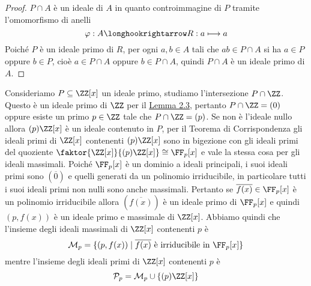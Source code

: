 \documentclass[11pt]{scrartcl}
\begin{document}
	\begin{proof}
		$P\cap A$ è un ideale di $A$ in quanto controimmagine di $P$ tramite
		l'omomorfismo di anelli
		\[
		\varphi: A \longhookrightarrow R: a \longmapsto a
		\]
		Poiché $P$ è un ideale primo di $R$, per ogni $a, b \in A$ tali che 
		$ab \in P\cap A$ si ha $a \in P$
		oppure $b \in P$, cioè $a \in P \cap A$ oppure $b \in P\cap A$, quindi
		$P \cap A$ è un ideale primo di $A$.
	\end{proof}
	
	
	Consideriamo $P \subseteq \ZZ[x]$ un ideale primo, studiamo l'intersezione
	$P \cap \ZZ$. Questo è un ideale primo di $\ZZ$ per il 
	\hyperref[lemma2.3]{Lemma 2.3}, pertanto $P\cap \ZZ = (0)$ oppure esiste un
	primo $p \in \ZZ$ tale che $P\cap\ZZ = (p)$. Se non è l'ideale nullo allora
	$(p)\ZZ[x]$ è un ideale contenuto in $P$, per il Teorema di 
	Corrispondenza gli ideali primi di $\ZZ[x]$ contenenti $(p)\ZZ[x]$ sono in 
	bigezione con gli ideali primi del quoziente $\faktor{\ZZ[x]}{(p)\ZZ[x]} \cong \FF_p[x]$
	e vale la stessa cosa per gli ideali massimali. 
	Poiché $\FF_p[x]$ è un dominio a ideali principali, i suoi ideali primi 
	sono $(\overline{0})$ e quelli generati da un polinomio irriducibile, in particolare
	tutti i suoi ideali primi non nulli sono anche massimali. Pertanto se $\overline{f(x)} \in \FF_p[x]$ è un polinomio
	irriducibile allora $(\overline{f(x)})$ è un ideale primo di $\FF_p[x]$
	e quindi $(p, f(x))$ è un ideale primo e massimale di $\ZZ[x]$. Abbiamo quindi che 
	l'insieme degli ideali massimali di $\ZZ[x]$ contenenti $p$ è
	\[
	\mathcal{M}_p = \{(p, f(x))\mid \overline{f(x)}\text{ è irriducibile in }
	\FF_p[x]\}
	\]
	mentre l'insieme degli ideali primi di $\ZZ[x]$ contenenti $p$ è
	\[
	\mathcal{P}_p = \mathcal{M}_p \cup\{(p)\ZZ[x]\}
	\]
	
\end{document}
